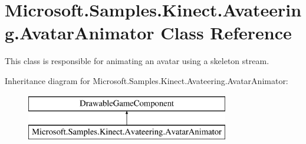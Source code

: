 \hypertarget{class_microsoft_1_1_samples_1_1_kinect_1_1_avateering_1_1_avatar_animator}{\section{Microsoft.\+Samples.\+Kinect.\+Avateering.\+Avatar\+Animator Class Reference}
\label{class_microsoft_1_1_samples_1_1_kinect_1_1_avateering_1_1_avatar_animator}
}


This class is responsible for animating an avatar using a skeleton stream.  


Inheritance diagram for Microsoft.\+Samples.\+Kinect.\+Avateering.\+Avatar\+Animator\+:\begin{figure}[H]
\begin{center}
\leavevmode
\includegraphics[height=2.000000cm]{class_microsoft_1_1_samples_1_1_kinect_1_1_avateering_1_1_avatar_animator}
\end{center}
\end{figure}
